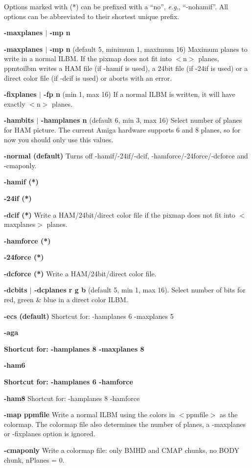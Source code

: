Options marked with (*) can be prefixed with a ``no'',
{\it e.g.}, ``-nohamif''. All options can be abbreviated to
their shortest unique prefix.
\begin{TPlist}{{\bf -maxplanes $|$ -mp n}}
\item[{{\bf -maxplanes $|$ -mp n}}]
(default 5, minimum 1, maximum 16)
Maximum planes to write in a normal ILBM.  If the pixmap
does not fit into $<$n$>$ planes, ppmtoilbm writes a HAM file
(if -hamif is used), a 24bit file (if -24if is used) or a
direct color file (if -dcif is used) or aborts with an error.
\item[{{\bf -fixplanes $|$ -fp n}}]
(min 1, max 16)
If a normal ILBM is written, it will have exactly $<$n$>$ planes.
\item[{{\bf -hambits $|$ -hamplanes n}}]
(default 6, min 3, max 16)
Select number of planes for HAM picture.  The current Amiga
hardware supports 6 and 8 planes, so for now you should
only use this values.
\item[{{\bf -normal (default)}}]
Turns off -hamif/-24if/-dcif, -hamforce/-24force/-dcforce and
-cmaponly.
\item[{{\bf -hamif (*)}}]
\item[{{\bf -24if (*)}}]
\item[{{\bf -dcif (*)}}]
Write a HAM/24bit/direct color file if the pixmap does not
fit into $<$maxplanes$>$ planes.
\item[{{\bf -hamforce (*)}}]
\item[{{\bf -24force (*)}}]
\item[{{\bf -dcforce (*)}}]
Write a HAM/24bit/direct color file.
\item[{{\bf -dcbits $|$ -dcplanes r g b}}]
(default 5, min 1, max 16).
Select number of bits for red, green \& blue in a direct
color ILBM.
\item[{{\bf -ecs (default)}}]
Shortcut for: -hamplanes 6 -maxplanes 5
\item[{{\bf -aga}}]
\item[{{\bf Shortcut for: -hamplanes 8 -maxplanes 8}}]
\item[{{\bf -ham6}}]
\item[{{\bf Shortcut for: -hamplanes 6 -hamforce}}]
\item[{{\bf -ham8}}]
Shortcut for: -hamplanes 8 -hamforce
\item[{{\bf -map ppmfile}}]
Write a normal ILBM using the colors in $<$ppmfile$>$ as the
colormap. The colormap file also determines the number of
planes, a -maxplanes or -fixplanes option is ignored.
\item[{{\bf -cmaponly}}]
Write a colormap file: only BMHD and CMAP chunks, no BODY
chunk, nPlanes = 0.
\end{TPlist}

